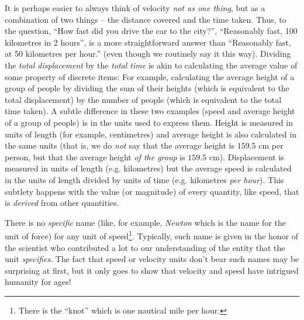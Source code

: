\documentclass[12pt,a4paper]{book}
\begin{document}
\begin{enumerate}
\begin{enumerate}
                It is perhaps easier to always think of velocity \emph{not as one thing}, but as a combination of two things -- the distance covered and the time taken. Thus, to the question, ``How fast did you drive the car to the city?'', ``Reasonably fast, 100 kilometres in 2 hours'', is a more straightforward answer than ``Reasonably fast, at 50 kilometres per hour.'' (even though we routinely say it this way). Dividing the \emph{total displacement} by the \emph{total time} is akin to calculating the average value of some property of discrete items: For example, calculating the average height of a group of people by dividing the sum of their heights (which is equivalent to the total displacement) by the number of people (which is equivalent to the total time taken). A subtle difference in these two examples (speed and average height of a group of people) is in the units used to express them. Height is measured in units of length (for example, centimetres) and average height is also calculated in the same units (that is, we do \emph{not} say that the average height is $159.5$ cm per person, but that the average height \emph{of the group} is $159.5$ cm). Displacement is measured in units of length (e.g. kilometres) but the average speed is calculated in the units of length divided by units of time (e.g. kilometres \emph{per hour}). 
                This subtlety happens with the value (or magnitude) of every quantity, like speed, that is \emph{derived} from other quantities.

                There is no \emph{specific} name (like, for example, \emph{Newton} which is the name for the unit of force) for any unit of speed\footnote{There is the ``knot'' which is one nautical mile per hour.}. Typically, such name is given in the honor of the scientist who contributed a lot to our understanding of the entity that the unit \emph{specifies}. The fact that speed or velocity units don't bear such names may be surprising at first, but it only goes to show that velocity and speed have intrigued humanity for ages!


\end{enumerate}
\end{enumerate}
\end{document}

